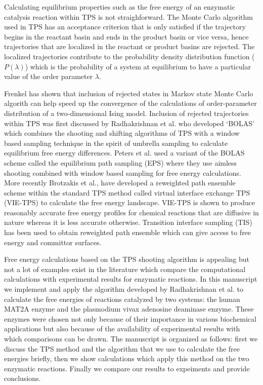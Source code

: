 \documentclass[journal=jpcbfk,manuscript=article,layout=twocolumn]{achemso}
\begin{document}
Calculating equilibrium properties such as the free energy of an enzymatic 
catalysis reaction within TPS is not straighforward. 
The Monte Carlo algorithm used in TPS has an acceptance criterion that 
is only satisfied if the trajectory begins in the reactant basin and ends in 
the product basin or vice versa, hence trajectories that are localized in the 
reactant or product basins are rejected. The localized trajectories contribute
to the probability density distribution function ($P(\lambda)$) which is the 
probability of a system at equilibrium to have a particular value of the 
order parameter $\lambda$. \cite{Dellago09AdvCompSimAppp167} 

Frenkel has shown that inclusion of rejected states in Markov state Monte 
Carlo algorith can help speed up the convergence of the calculations of 
order-parameter distribution of a two-dimensional
Ising model. \cite{Frenkel04ProcNatAcadSci101p17571}
Inclusion of rejected trajectories within TPS was first discussed by Radhakrishnan 
et al. \cite{Radhakrishnan04JChemPhys121p2436} who developed `BOLAS' which combines 
the shooting and shifting algorithms of TPS with a window based sampling technique 
in the spirit of umbrella sampling to calculate equilibrium free energy 
differences. Peters et al. used a variant of the BOLAS scheme called the 
equilibrium path sampling (EPS) where they use aimless shooting 
combined with window based sampling for free energy calculations. 
\cite{Peters08JAmChemSoc130p17342,Beckham10epsbook} 
More recently Brotzakis et al., \cite{Brotzakis19JChemPhys151p174111}
have developed a reweighted path ensemble scheme within the standard TPS method 
called virtual interface exchange TPS (VIE-TPS) to calculate the free energy 
landscape. VIE-TPS is shown to produce reasonably accurate free energy profiles for 
chemical reactions that are diffusive in nature whereas it is less accurate otherwise.
Transition interface sampling (TIS) has been used to obtain 
reweighted path ensemble which can give access to free energy 
and committor surfaces. \cite{Rogal10JChemPhys17p174109}

Free energy calculations based on the TPS shooting algorithm is 
appealing but not a lot of examples exist in the literature 
which compare the computational calculations with experimental
results for enzymatic reactions.  
In this manuscript we implement and apply the 
algorithm developed by Radhakrishnan et al. \cite{Radhakrishnan04JChemPhys121p2436} 
to calculate the free energies of reactions catalyzed by two systems:
the human MAT2A enzyme and the plasmodium vivax adenosine deaminase 
enzyme. \cite{Luo07JAmChemSoc129p8008,Ho09Biochemistry48p9618}
These enzymes were chosen not only because of their importance in various 
biochemical applications but also because of the availability of experimental 
results with which comparisons can be drawn. The manuscript is organized as 
follows: first we discuss the TPS method and the algorithm that we use 
to calculate the free energies briefly, then we show calculations which apply this 
method on the two enzymatic reactions. Finally we compare our results to expeiments
and provide conclusions. 
\end{document}
